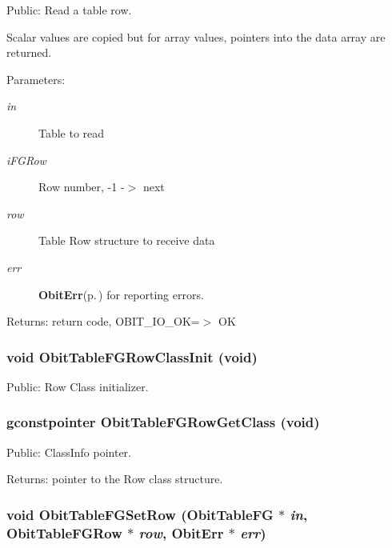 Public: Read a table row. 

Scalar values are copied but for array values, pointers into the data array are returned. \begin{Desc}
\item[Parameters:]
\begin{description}
\item[{\em in}]Table to read \item[{\em i\-FGRow}]Row number, -1 -$>$ next \item[{\em row}]Table Row structure to receive data \item[{\em err}]{\bf Obit\-Err}{\rm (p.\,\pageref{structObitErr})} for reporting errors. \end{description}
\end{Desc}
\begin{Desc}
\item[Returns:]return code, OBIT\_\-IO\_\-OK=$>$ OK \end{Desc}
\subsubsection{\setlength{\rightskip}{0pt plus 5cm}void Obit\-Table\-FGRow\-Class\-Init (void)}\label{ObitTableFG_8h_a7}


Public: Row Class initializer. 

\subsubsection{\setlength{\rightskip}{0pt plus 5cm}gconstpointer Obit\-Table\-FGRow\-Get\-Class (void)}\label{ObitTableFG_8h_a9}


Public: Class\-Info pointer. 

\begin{Desc}
\item[Returns:]pointer to the Row class structure. \end{Desc}
\subsubsection{\setlength{\rightskip}{0pt plus 5cm}void Obit\-Table\-FGSet\-Row ({\bf Obit\-Table\-FG} $\ast$ {\em in}, {\bf Obit\-Table\-FGRow} $\ast$ {\em row}, {\bf Obit\-Err} $\ast$ {\em err})}\label{ObitTableFG_8h_a19}


